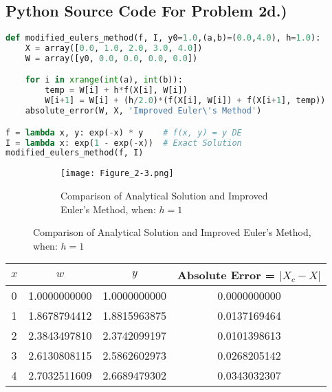 \documentclass{article}
\begin{document}
\subsection*{Python Source Code For Problem 2d.)}
\begin{lstlisting}[language=Python]
def modified_eulers_method(f, I, y0=1.0,(a,b)=(0.0,4.0), h=1.0):
    X = array([0.0, 1.0, 2.0, 3.0, 4.0])
    W = array([y0, 0.0, 0.0, 0.0, 0.0])

    for i in xrange(int(a), int(b)):
        temp = W[i] + h*f(X[i], W[i])
        W[i+1] = W[i] + (h/2.0)*(f(X[i], W[i]) + f(X[i+1], temp))
    absolute_error(W, X, 'Improved Euler\'s Method')

f = lambda x, y: exp(-x) * y    # f(x, y) = y DE
I = lambda x: exp(1 - exp(-x))  # Exact Solution
modified_eulers_method(f, I)
\end{lstlisting}

\begin{figure}[h!]
  \centering
  \begin{subfigure}{\linewidth}
    \texttt{[image: Figure\_2-3.png]}
    \caption{Comparison of Analytical Solution and Improved Euler's Method, when: $h = 1$}
  \end{subfigure}
\end{figure}
 \begin{center}
\begin{tabular}{ |c|c|c|c| } 
 \hline \hline
    $x$    &  $w$           &  $y$ & Absolute Error = $|X_c - X|$ \\ 
 \hline \hline       
    0   & 1.0000000000 & 1.0000000000 & 0.0000000000\\
 \hline
    1   & 1.8678794412 & 1.8815963875 & 0.0137169464\\
 \hline
    2   & 2.3843497810 & 2.3742099197 & 0.0101398613\\
 \hline
    3   & 2.6130808115 & 2.5862602973 & 0.0268205142\\
 \hline
    4   & 2.7032511609 & 2.6689479302 & 0.0343032307\\
 \hline
\end{tabular}
\end{center}
\pagebreak
\end{document}
